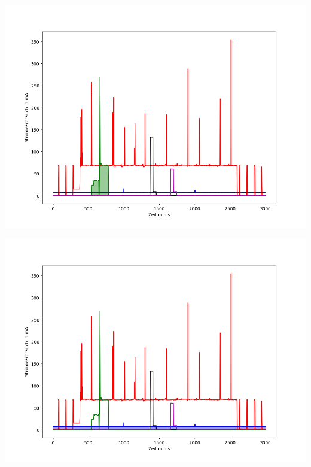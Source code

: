 \documentclass[18pt]{beamer}
\begin{document}
\begin{frame}
	\begin{minipage}[c][\textheight][c]{\textwidth}
		\centering
		\includegraphics[height=0.95\textheight]{plots/alle2.png}
	\end{minipage}
\end{frame}

\begin{frame}
	\begin{minipage}[c][\textheight][c]{\textwidth}
		\centering
		\includegraphics[height=0.95\textheight]{plots/alle3.png}
	\end{minipage}
\end{frame}
\end{document}
